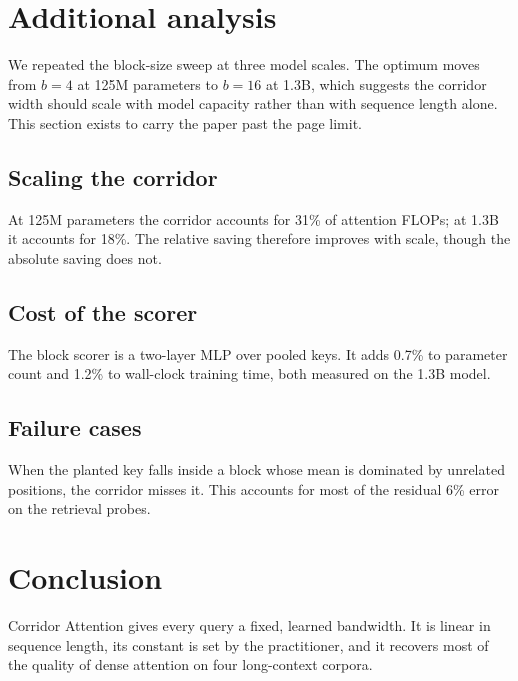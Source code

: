 \documentclass[11pt,twocolumn]{article}
\begin{document}
\section{Additional analysis}
We repeated the block-size sweep at three model scales. The optimum moves from
$b=4$ at 125M parameters to $b=16$ at 1.3B, which suggests the corridor width
should scale with model capacity rather than with sequence length alone. This
section exists to carry the paper past the page limit.

\subsection{Scaling the corridor}
At 125M parameters the corridor accounts for 31\% of attention FLOPs; at 1.3B it
accounts for 18\%. The relative saving therefore improves with scale, though the
absolute saving does not.

\subsection{Cost of the scorer}
The block scorer is a two-layer MLP over pooled keys. It adds 0.7\% to parameter
count and 1.2\% to wall-clock training time, both measured on the 1.3B model.

\subsection{Failure cases}
When the planted key falls inside a block whose mean is dominated by unrelated
positions, the corridor misses it. This accounts for most of the residual 6\%
error on the retrieval probes.

\section{Conclusion}
Corridor Attention gives every query a fixed, learned bandwidth. It is linear in
sequence length, its constant is set by the practitioner, and it recovers most of
the quality of dense attention on four long-context corpora.
\end{document}
